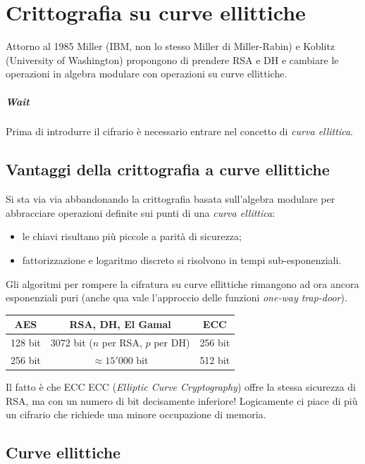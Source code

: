 \chapter{Crittografia su curve ellittiche}
Attorno al 1985 Miller (IBM, non lo stesso Miller di Miller-Rabin) e Koblitz (University of Washington) propongono di prendere RSA e DH e cambiare le operazioni in algebra modulare con operazioni su curve ellittiche.
\paragraph{Wait} Prima di introdurre il cifrario è necessario entrare nel concetto di \emph{curva ellittica}.

\section{Vantaggi della crittografia a curve ellittiche}
Si sta via via abbandonando la crittografia basata sull'algebra modulare per abbracciare operazioni definite sui punti di una \emph{curva ellittica}: 
\begin{itemize}
	\item le chiavi risultano più piccole a parità di sicurezza;
	\item fattorizzazione e logaritmo discreto si risolvono in tempi sub-esponenziali.
\end{itemize}
Gli algoritmi per rompere la cifratura su curve ellittiche rimangono ad ora ancora esponenziali puri (anche qua vale l'approccio delle funzioni \emph{one-way trap-door}).
\begin{table}[ht]
    \centering
    \begin{tabular}{c|c|c}
        AES & RSA, DH, El Gamal & ECC \\
        \hline
        128 bit & 3072 bit ($n$ per RSA, $p$ per DH) & 256 bit \\
        256 bit & $\approx 15'000$ bit & 512 bit
    \end{tabular}
\end{table}

\noindent Il fatto è che ECC ECC (\emph{Elliptic Curve Cryptography}) offre la stessa sicurezza di RSA, ma con un numero di bit decisamente inferiore! Logicamente ci piace di più un cifrario che richiede una minore occupazione di memoria.

\section{Curve ellittiche}
